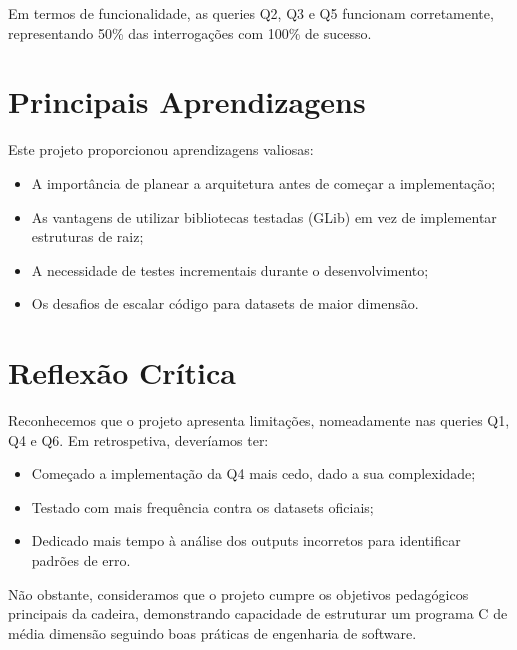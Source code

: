 \documentclass[a4paper,12pt]{scrreprt}
\begin{document}
Em termos de funcionalidade, as queries Q2, Q3 e Q5 funcionam corretamente, representando 50\% das interrogações com 100\% de sucesso.

\section{Principais Aprendizagens}

Este projeto proporcionou aprendizagens valiosas:

\begin{itemize}
    \item A importância de planear a arquitetura antes de começar a implementação;
    \item As vantagens de utilizar bibliotecas testadas (GLib) em vez de implementar estruturas de raiz;
    \item A necessidade de testes incrementais durante o desenvolvimento;
    \item Os desafios de escalar código para datasets de maior dimensão.
\end{itemize}

\section{Reflexão Crítica}

Reconhecemos que o projeto apresenta limitações, nomeadamente nas queries Q1, Q4 e Q6. Em retrospetiva, deveríamos ter:

\begin{itemize}
    \item Começado a implementação da Q4 mais cedo, dado a sua complexidade;
    \item Testado com mais frequência contra os datasets oficiais;
    \item Dedicado mais tempo à análise dos outputs incorretos para identificar padrões de erro.
\end{itemize}

Não obstante, consideramos que o projeto cumpre os objetivos pedagógicos principais da cadeira, demonstrando capacidade de estruturar um programa C de média dimensão seguindo boas práticas de engenharia de software.
\end{document}
